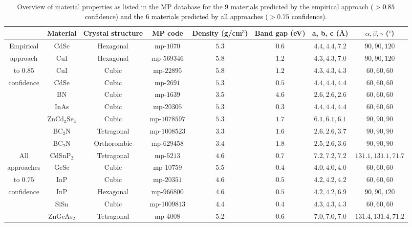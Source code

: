 \documentclass[superscriptaddress,unsortedaddress,
 amsmath,amssymb,
 aps,
]{revtex4-2}
\newcommand{\mrk}[1]{\textcolor{black}{#1}}
\begin{document}
\begin{table}[t]
    \centering 
    \caption{Overview of material properties as listed in the MP database for the $9$ materials predicted by the empirical approach \mrk{($>0.85$ confidence) and the $6$ materials predicted by all approaches ($>0.75$ confidence).} %
    }
    \begin{tabular}{c|c c c c c c c }
      & Material & Crystal structure & MP code & Density (g/cm$^3$) & Band gap (\si{\electronvolt}) & a, b, c (\AA) & $\alpha,\beta,\gamma$ ($^\circ$) \\
    \hline 
    Empirical & CdSe & Hexagonal & mp-$1070$ & $5.3$ & $0.6$ & $4.4,4.4,7.2$ & $90,90,120$ \\
    approach  & CuI & Hexagonal & mp-$569346$ & $5.8$ & $1.2$ & $4.3,4.3,7.0$ & $90,90,120$ \\ 
    to $0.85$  & CuI & Cubic & mp-$22895$ & $5.8$ & $1.2$ & $4.3,4.3,4.3$ & $60,60,60$  \\ 
    confidence & CdSe & Cubic & mp-$2691$ & $5.3$ & $0.5$ & $4.4,4.4,4.4$ & $60,60,60$  \\
     & BN & Cubic & mp-$1639$ & $3.5$ & $4.6$ & $2.6,2.6,2.6$ & $60,60,60$  \\
     & InAs & Cubic & mp-$20305$ & $5.3$ & $0.3$ & $4.4,4.4,4.4$ & $60,60,60$ \\
     & ZnCd$_3$Se$_4$ & Cubic & mp-$1078597$ & $5.3$ & $1.7$ & $6.1,6.1,6.1$ & $90,90,90$ \\
     & BC$_2$N & Tetragonal & mp-$1008523$ & $3.3$ & $1.6$ & $2.6,2.6,3.7$ & $90,90,90$ \\
     & BC$_2$N & Orthorombic & mp-$629458$ & $3.4$ & $1.8$ & $2.5,2.6,3.6$ & $90,90,90$ \\
    \hline 
    All & CdSnP$_2$ & Tetragonal & mp-$5213$ & $4.6$ & $0.7$ & $7.2,7.2,7.2$ & $131.1,131.1,71.7$ \\
    approaches & GeSe & Cubic & mp-$10759$ & $5.5$ & $0.4$ & $4.0,4.0,4.0$ & $60,60,60$ \\
    to $0.75$  & InP & Cubic & mp-$20351$ & $4.6$ & $0.5$ & $4.2,4.2,4.2$ &  $60,60,60$\\ 
    confidence & InP & Hexagonal & mp-$966800$ & $4.6$ & $0.5$ & $4.2,4.2,6.9$ & $90,90,120$ \\ 
     & SiSn & Cubic & mp-$1009813$ & $4.4$ & $0.4$ & $4.3,4.3,4.3$ & $60,60,60$ \\
     & ZnGeAs$_2$ & Tetragonal & mp-$4008$ & $5.2$ & $0.6$ & $7.0,7.0,7.0$ & $131.4,131.4,71.2$ \\
    \end{tabular}
    \label{tab:materialproperties}
\end{table}
\end{document}
